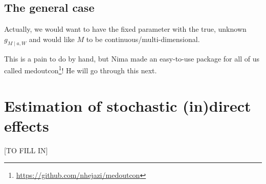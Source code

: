 \documentclass[
  12pt, krantz2,
]{book}
\makeatletter
\newenvironment{Shaded}{\begin{snugshade}}{\end{snugshade}}
\newcommand{\CommentTok}[1]{\textcolor[rgb]{0.56,0.35,0.01}{\textit{#1}}}
\newcommand{\KeywordTok}[1]{\textcolor[rgb]{0.13,0.29,0.53}{\textbf{#1}}}
\newcommand{\NormalTok}[1]{#1}
\newcommand{\OperatorTok}[1]{\textcolor[rgb]{0.81,0.36,0.00}{\textbf{#1}}}
\newcommand{\StringTok}[1]{\textcolor[rgb]{0.31,0.60,0.02}{#1}}
\renewcommand{\href}[2]{#2\footnote{\url{#1}}}
\newenvironment{kframe}{%
\medskip{}
\setlength{\fboxsep}{.8em}
 \def\at@end@of@kframe{}%
 \ifinner\ifhmode%
  \def\at@end@of@kframe{\end{minipage}}%
  \begin{minipage}{\columnwidth}%
 \fi\fi%
 \def\FrameCommand##1{\hskip\@totalleftmargin \hskip-\fboxsep
 \colorbox{shadecolor}{##1}\hskip-\fboxsep
     \hskip-\linewidth \hskip-\@totalleftmargin \hskip\columnwidth}%
 \MakeFramed {\advance\hsize-\width
   \@totalleftmargin\z@ \linewidth\hsize
   \@setminipage}}%
 {\par\unskip\endMakeFramed%
 \at@end@of@kframe}
\renewenvironment{Shaded}{\begin{kframe}}{\end{kframe}}
\theoremstyle{definition}
\theoremstyle{definition}
\theoremstyle{definition}
\newcommand{\1}{\mathbbm{1}}
\makeatother
\begin{document}
\begin{Shaded}
\end{Shaded}

\hypertarget{the-general-case}{%
\section{The general case}\label{the-general-case}}

Actually, we would want to have the fixed parameter with the true, unknown
\(g_{M \mid a, W}\) and would like \(M\) to be continuous/multi-dimensional.

This is a pain to do by hand, but Nima made an easy-to-use package for all of us
called \href{https://github.com/nhejazi/medoutcon}{medoutcon}! He will go through
this next.

\hypertarget{estimation-of-stochastic-indirect-effects}{%
\chapter{Estimation of stochastic (in)direct effects}\label{estimation-of-stochastic-indirect-effects}}

{[}TO FILL IN{]}

  

\backmatter
\printindex
\end{document}
